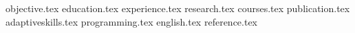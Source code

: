 \documentclass{awesome-cv}
\newcommand*{\sectiondir}{Resume/}
\begin{document}
	\makecvheader
	
	{objective.tex}	
	{education.tex}	
	{experience.tex}
	{research.tex}
	{courses.tex}
	{publication.tex}
	{adaptiveskills.tex}
	{programming.tex}	
	{english.tex}
	\pagebreak
	{reference.tex}
	
\end{document}
